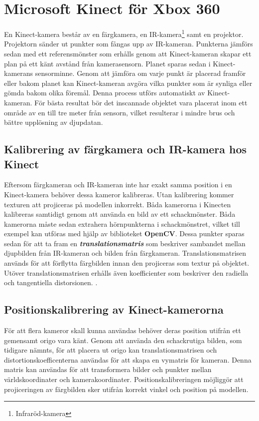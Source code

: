 \documentclass[a4paper,12pt,oneside,final]{extbook}
\begin{document}
\section {Microsoft Kinect för Xbox 360}
\label{Kinect}
En Kinect-kamera består av en färgkamera, en IR-kamera\footnote{Infraröd-kamera} samt en projektor. Projektorn sänder ut punkter som fångas upp av IR-kameran. Punkterna jämförs sedan med ett referensmönster som erhålls genom att Kinect-kameran skapar ett plan på ett känt avstånd från kamerasensorn. Planet sparas sedan i Kinect-kamerans sensorminne. Genom att jämföra om varje punkt är placerad framför eller bakom planet kan Kinect-kameran avgöra vilka punkter som är synliga eller gömda bakom olika föremål. Denna process utförs automatiskt av Kinect-kameran. För bästa resultat bör det inscannade objektet vara placerat inom ett område av en till tre meter från sensorn, vilket resulterar i mindre brus och bättre upplösning av djupdatan\cite{Kinectsensor}.

\subsection{Kalibrering av färgkamera och IR-kamera hos Kinect}
Eftersom färgkameran och IR-kameran inte har exakt samma position i en Kinect-kamera behöver dessa kameror kalibreras. Utan kalibrering kommer texturen att projiceras på modellen inkorrekt\cite{Kinectsensor}. Båda kamerorna i Kinecten kalibreras samtidigt genom att använda en bild av ett schackmönster. Båda kamerorna måste sedan extrahera hörnpunkterna i schackmönstret, vilket till exempel kan utföras med hjälp av biblioteket \textbf{OpenCV}. Dessa punkter sparas sedan för att ta fram en \emph{\textbf{translationsmatris}} som beskriver sambandet mellan djupbilden från IR-kameran och bilden från färgkameran. Translationsmatrisen används för att förflytta färgbilden innan den projiceras som textur på objektet. Utöver translationsmatrisen erhålls även koefficienter som beskriver den radiella och tangentiella distorsionen. \cite{detphcomvis}.

\subsection{Positionskalibrering av Kinect-kamerorna}
För att flera kameror skall kunna användas behöver deras position utifrån ett gemensamt origo vara känt. Genom att använda den schackrutiga bilden, som tidigare nämnts, för att placera ut origo kan translationsmatrisen och distortionskoefficenterna användas för att skapa en vymatris för kameran. Denna matris kan användas för att transformera bilder och punkter mellan världskoordinater och kamerakoordinater. Positionskalibreringen möjliggör att projiceringen av färgbilden sker utifrån korrekt vinkel och position på modellen\cite{kinectextrinc}.
\end{document}
